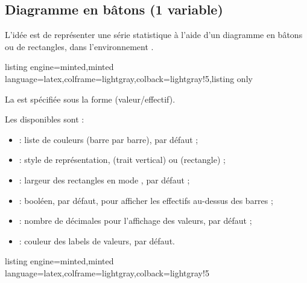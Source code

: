 \documentclass[11pt,a4paper]{ltxdoc}
\begin{document}
\pagebreak

\subsection{Diagramme en bâtons (1 variable)}\label{diagbatons}

L'idée est de représenter une série statistique à l'aide d'un diagramme en bâtons ou de rectangles, dans l'environnement .

\begin{tcblisting}{listing engine=minted,minted language=latex,colframe=lightgray,colback=lightgray!5,listing only}
\end{tcblisting}

La  est spécifiée sous la forme  (valeur/effectif).

\smallskip

Les \MontreCode{[clés]} disponibles sont :

\begin{itemize}
  \item {} : liste de couleurs (barre par barre),  par défaut ;
  \item {} : style de représentation,  (trait vertical) ou  (rectangle) ;
  \item {} : largeur des rectangles en mode ,  par défaut ;
  \item {} : booléen,  par défaut, pour afficher les effectifs au-dessus des barres ;
  \item {} : nombre de décimales pour l'affichage des valeurs,  par défaut ;
  \item {} : couleur des labels de valeurs,  par défaut.
\end{itemize}

\begin{tcblisting}{listing engine=minted,minted language=latex,colframe=lightgray,colback=lightgray!5}
\begin{GraphiqueTikz}%
  [x=1.2cm,y=0.4cm,Xmin=0,Xmax=7,Xgrille=1,Ymin=0,Ymax=15,Ygrille=5,Ygrilles=1]
\end{GraphiqueTikz}
\end{tcblisting}
\end{document}
